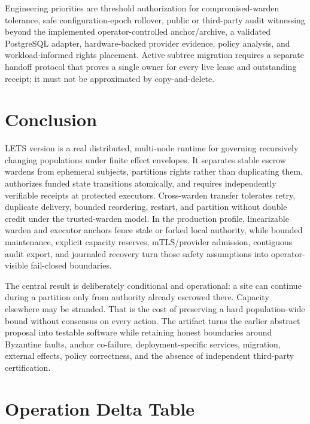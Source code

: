 \documentclass[10pt]{article}
\newcommand{\LETS}{\textsc{LETS}}
\begin{document}
Engineering priorities are threshold authorization for compromised-warden tolerance, safe
configuration-epoch rollover, public or third-party audit witnessing beyond the implemented
operator-controlled anchor/archive, a validated PostgreSQL adapter, hardware-backed provider
evidence, policy analysis, and workload-informed rights placement. Active
subtree migration requires a separate handoff protocol that proves a single owner for every live
lease and outstanding receipt; it must not be approximated by copy-and-delete.

\section{Conclusion}

\LETS{} version \ArtifactVersion{} is a real distributed, multi-node runtime for governing
recursively changing populations under finite effect envelopes. It separates stable escrow
wardens from ephemeral subjects, partitions rights rather than duplicating them, authorizes
funded state transitions atomically, and requires independently verifiable receipts at protected
executors. Cross-warden transfer tolerates retry, duplicate delivery, bounded reordering, restart,
and partition without double credit under the trusted-warden model. In the production profile,
linearizable warden and executor anchors fence stale or forked local authority, while bounded
maintenance, explicit capacity reserves, mTLS/provider admission, contiguous audit export, and
journaled recovery turn those safety assumptions into operator-visible fail-closed boundaries.

The central result is deliberately conditional and operational: a site can continue during a
partition only from authority already escrowed there. Capacity elsewhere may be stranded. That is
the cost of preserving a hard population-wide bound without consensus on every action. The
artifact turns the earlier abstract proposal into testable software while retaining honest
boundaries around Byzantine faults, anchor co-failure, deployment-specific services, migration,
external effects, policy correctness, and the absence of independent third-party certification.

\appendix

\section{Operation Delta Table}
\end{document}
